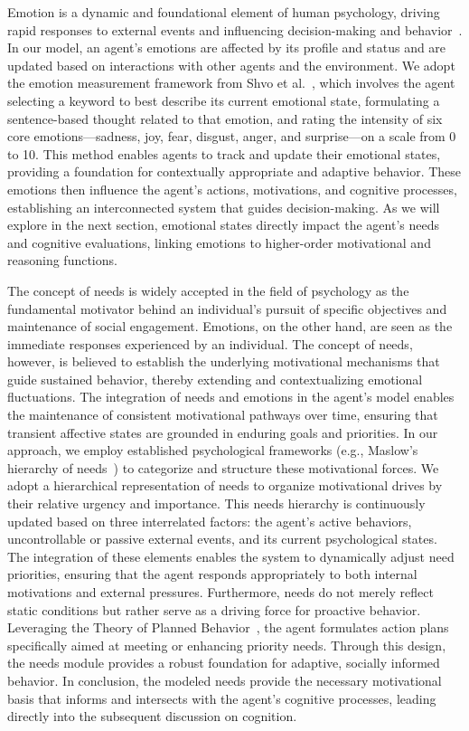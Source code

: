 
Emotion is a dynamic and foundational element of human psychology, driving rapid responses to external events and influencing decision-making and behavior~\cite{shvo2019interdependent}. In our model,  an agent's emotions are affected by its profile and status and are updated based on interactions with other agents and the environment. We adopt the emotion measurement framework from Shvo et al.~\cite{shvo2019interdependent}, which involves the agent selecting a keyword to best describe its current emotional state, formulating a sentence-based thought related to that emotion, and rating the intensity of six core emotions—sadness, joy, fear, disgust, anger, and surprise—on a scale from 0 to 10. This method enables agents to track and update their emotional states, providing a foundation for contextually appropriate and adaptive behavior. These emotions then influence the agent’s actions, motivations, and cognitive processes, establishing an interconnected system that guides decision-making. As we will explore in the next section, emotional states directly impact the agent's needs and cognitive evaluations, linking emotions to higher-order motivational and reasoning functions.


The concept of needs is widely accepted in the field of psychology as the fundamental motivator behind an individual's pursuit of specific objectives and maintenance of social engagement. Emotions, on the other hand, are seen as the immediate responses experienced by an individual. The concept of needs, however, is believed to establish the underlying motivational mechanisms that guide sustained behavior, thereby extending and contextualizing emotional fluctuations. The integration of needs and emotions in the agent's model enables the maintenance of consistent motivational pathways over time, ensuring that transient affective states are grounded in enduring goals and priorities.
In our approach, we employ established psychological frameworks (e.g., Maslow's hierarchy of needs~\cite{acevedo2018personalistic}) to categorize and structure these motivational forces. We adopt a hierarchical representation of needs to organize motivational drives by their relative urgency and importance. This needs hierarchy is continuously updated based on three interrelated factors: the agent's active behaviors, uncontrollable or passive external events, and its current psychological states. The integration of these elements enables the system to dynamically adjust need priorities, ensuring that the agent responds appropriately to both internal motivations and external pressures. Furthermore, needs do not merely reflect static conditions but rather serve as a driving force for proactive behavior. Leveraging the Theory of Planned Behavior~\cite{ajzen1991theory}, the agent formulates action plans specifically aimed at meeting or enhancing priority needs. Through this design, the needs module provides a robust foundation for adaptive, socially informed behavior.
In conclusion, the modeled needs provide the necessary motivational basis that informs and intersects with the agent's cognitive processes, leading directly into the subsequent discussion on cognition.


